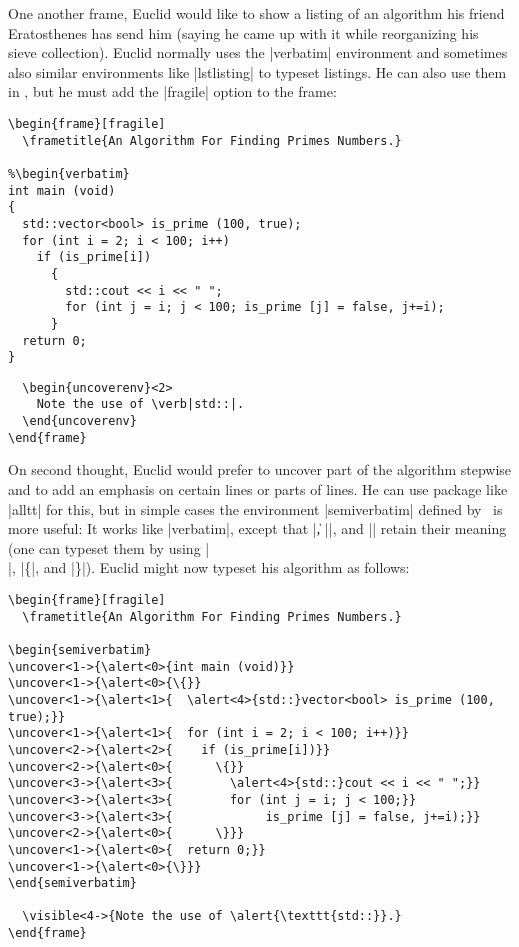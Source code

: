 One another frame, Euclid would like to show a listing of an
algorithm his friend Eratosthenes has send him (saying he came up with
it while reorganizing his sieve collection). Euclid normally uses the
|verbatim| environment and sometimes also similar environments like
|lstlisting| to typeset listings. He can also use them in \beamer, but
he must add the |fragile| option to the frame:
\begin{verbatim}
\begin{frame}[fragile]
  \frametitle{An Algorithm For Finding Primes Numbers.}

%\begin{verbatim} 
int main (void)
{
  std::vector<bool> is_prime (100, true);
  for (int i = 2; i < 100; i++)
    if (is_prime[i])
      {
        std::cout << i << " ";
        for (int j = i; j < 100; is_prime [j] = false, j+=i);
      }
  return 0;
} 
\end{verbatim}
\unskip{\MacroFont|\end{verbatim}|}
\begin{verbatim}
  \begin{uncoverenv}<2>
    Note the use of \verb|std::|.
  \end{uncoverenv}
\end{frame}
\end{verbatim}


On second thought, Euclid would prefer to uncover part of the
algorithm stepwise and to add an emphasis on certain lines or parts of
lines. He can use package like |alltt| for this, but in simple cases
the environment |{semiverbatim}| defined by \beamer\ is more useful:
It works like |{verbatim}|, except that |\|, |{|, and |}| retain their
meaning (one can typeset them by using |\\|, |\{|, and |\}|). Euclid
might now typeset his algorithm as follows:

\begin{verbatim}
\begin{frame}[fragile]
  \frametitle{An Algorithm For Finding Primes Numbers.}

\begin{semiverbatim}    
\uncover<1->{\alert<0>{int main (void)}}
\uncover<1->{\alert<0>{\{}}
\uncover<1->{\alert<1>{  \alert<4>{std::}vector<bool> is_prime (100, true);}}
\uncover<1->{\alert<1>{  for (int i = 2; i < 100; i++)}}
\uncover<2->{\alert<2>{    if (is_prime[i])}}
\uncover<2->{\alert<0>{      \{}}
\uncover<3->{\alert<3>{        \alert<4>{std::}cout << i << " ";}}
\uncover<3->{\alert<3>{        for (int j = i; j < 100;}}
\uncover<3->{\alert<3>{             is_prime [j] = false, j+=i);}}
\uncover<2->{\alert<0>{      \}}}
\uncover<1->{\alert<0>{  return 0;}}
\uncover<1->{\alert<0>{\}}}
\end{semiverbatim}

  \visible<4->{Note the use of \alert{\texttt{std::}}.}
\end{frame}
\end{verbatim}

